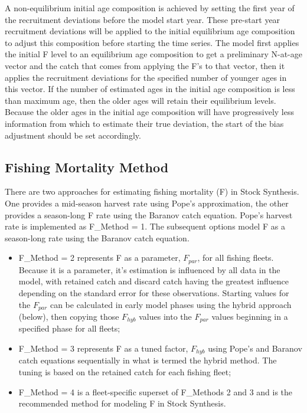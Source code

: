 
A non-equilibrium initial age composition is achieved by setting the first year of the recruitment deviations before the model start year. These pre-start year recruitment deviations will be applied to the initial equilibrium age composition to adjust this composition before starting the time series. The model first applies the initial F level to an equilibrium age composition to get a preliminary N-at-age vector and the catch that comes from applying the F's to that vector, then it applies the recruitment deviations for the specified number of younger ages in this vector. If the number of estimated ages in the initial age composition is less than maximum age, then the older ages will retain their equilibrium levels. Because the older ages in the initial age composition will have progressively less information from which to estimate their true deviation, the start of the bias adjustment should be set accordingly.

\subsection{Fishing Mortality Method}
There are two approaches for estimating fishing mortality (F) in Stock Synthesis. One provides a mid-season harvest rate using Pope’s approximation, the other provides a season-long F rate using the Baranov catch equation. Pope’s harvest rate is implemented as F\_Method = 1. The subsequent options model F as a season-long rate using the Baranov catch equation.
\begin{itemize}
	\item F\_Method = 2 represents F as a parameter, $F_{par}$, for all fishing fleets. Because it is a parameter, it's estimation is influenced by all data in the model, with retained catch and discard catch having the greatest influence depending on the standard error for these observations. Starting values for the $F_{par}$ can be calculated in early model phases using the hybrid approach (below), then copying those $F_{hyb}$ values into the $F_{par}$ values beginning in a specified phase for all fleets;
	\item  F\_Method = 3 represents F as a tuned factor, $F_{hyb}$ using Pope's and Baranov catch equations sequentially in what is termed the hybrid method. The tuning is based on the retained catch for each fishing fleet;
	\item  F\_Method = 4 is a fleet-specific superset of F\_Methods 2 and 3 and is the recommended method for modeling F in Stock Synthesis.
\end{itemize}


